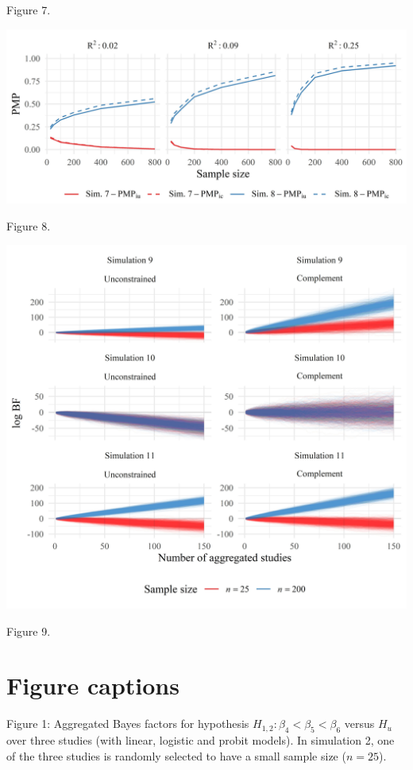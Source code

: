 \documentclass[
]{interact}
\begin{document}
Figure 7.

\includegraphics[width=1\textwidth,height=\textheight]{figures/figure-8.jpeg}

Figure 8.

\includegraphics[width=1\textwidth,height=\textheight]{figures/figure-9.jpeg}

Figure 9.

\hypertarget{figure-captions}{%
\section{Figure captions}\label{figure-captions}}

Figure 1: Aggregated Bayes factors for hypothesis
\(H_{1,2}: \beta_4 < \beta_5 < \beta_6\) versus \(H_u\) over three
studies (with linear, logistic and probit models). In simulation 2, one
of the three studies is randomly selected to have a small sample size
(\(n = 25\)).
\end{document}
